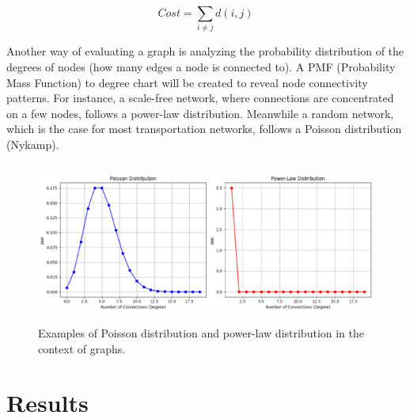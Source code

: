 \documentclass[11pt]{article}
\begin{document}
\[ Cost = \sum_{i\neq j} d\left(i,j\right) \] \par
	Another way of evaluating a graph is analyzing the probability distribution of the degrees of nodes (how many edges a node is connected to). A PMF (Probability Mass Function) to degree chart will be created to reveal node connectivity patterns. For instance, a scale-free network, where connections are concentrated on a few nodes, follows a power-law distribution. Meanwhile a random network, which is the case for most transportation networks, follows a Poisson distribution (Nykamp).  
\begin{figure}[H]
\centering
\hspace*{-2cm}
\includegraphics[height=200px]{exdist.png}
\caption{Examples of Poisson distribution and power-law distribution in the context of graphs.  }
\end{figure}
\section{Results}
\end{document}
